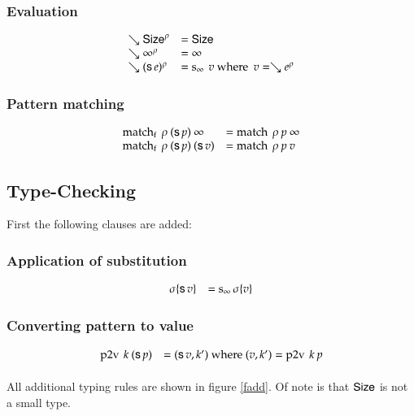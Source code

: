 \subsubsection{Evaluation}

\[
\begin{array}{ll}
\searrow \mathsf{Size}^{\rho} & = \mathsf{Size} \\
\searrow \infty^{\rho} & = \infty  \\
\searrow (\mathsf{s}\, e)^{\rho} & = \operatorname{s_{\infty}} \: v \mbox{ where } \: v = \searrow e^{\rho} \\ 
\end{array}
\]



\subsubsection{Pattern matching}
\[
\begin{array}{ll}
\operatorname{match_f} \: \rho \: (\mathsf{s}\, p) \: \infty & = \operatorname{match} \: \rho \: p \: \infty \\
\operatorname{match_f} \: \rho \: (\mathsf{s}\, p) \: (\mathsf{s}\, v) & = \operatorname{match} \: \rho \: p \: v \\
\end{array}
\]

\subsection{Type-Checking}

First the following clauses are added:
\subsubsection{Application of substitution}
\[
\begin{array}{ll}
\sigma\{\mathsf{s}\, v\} & = \operatorname{s_{\infty}} \sigma\{v\} \\
\end{array}
\]

\subsubsection{Converting pattern to value}
\[
\begin{array}{ll}
\operatorname{p2v} \: k \: (\mathsf{s}\, p) & = (\mathsf{s}\, v,k') \mbox{ where } (v,k') = \operatorname{p2v} \: k \: p\\
\end{array}
\]

\paragraph*{}
\noindent All additional typing rules are shown in figure \ref{fadd}.
Of note is that $\mathsf{Size}$ is not a small type.

